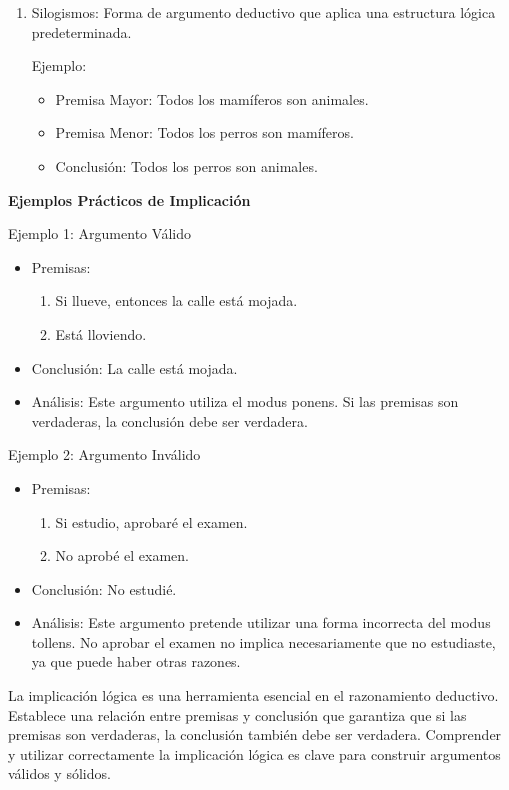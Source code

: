\begin{enumerate}
   \item Silogismos: Forma de argumento deductivo que aplica una estructura lógica predeterminada.
         
         Ejemplo:
         \begin{itemize}
            \item Premisa Mayor: Todos los mamíferos son animales.
            \item Premisa Menor: Todos los perros son mamíferos.
            \item Conclusión: Todos los perros son animales.
         \end{itemize}
\end{enumerate}

\textbf{Ejemplos Prácticos de Implicación}

Ejemplo 1: Argumento Válido

\begin{itemize}
   \item Premisas:
         \begin{enumerate}
            \item Si llueve, entonces la calle está mojada.
            \item Está lloviendo.
         \end{enumerate}
   \item Conclusión: La calle está mojada.
   \item Análisis: Este argumento utiliza el modus ponens. Si las premisas son verdaderas, la conclusión debe ser verdadera.
\end{itemize}

Ejemplo 2: Argumento Inválido

\begin{itemize}
   \item Premisas:
         \begin{enumerate}
            \item Si estudio, aprobaré el examen.
            \item No aprobé el examen.
         \end{enumerate}
   \item Conclusión: No estudié.
   \item Análisis: Este argumento pretende utilizar una forma incorrecta del modus tollens. No aprobar el examen no implica necesariamente que no estudiaste, ya que puede haber otras razones.
\end{itemize}


La implicación lógica es una herramienta esencial en el razonamiento deductivo. Establece una relación entre premisas y conclusión que garantiza que si las premisas son verdaderas, la conclusión también debe ser verdadera. Comprender y utilizar correctamente la implicación lógica es clave para construir argumentos válidos y sólidos.

